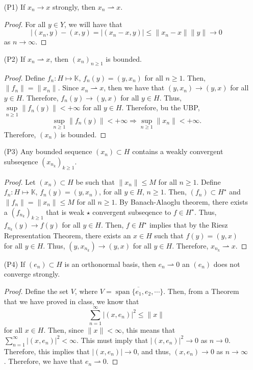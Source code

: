 \documentclass[12pt]{article}
\def\K{\mathbb{K}}
\newcommand{\ov}{\overline}
\newcommand{\sbs}{\subset}
\newcommand{\Hs}{H^{\star}}
\DeclareMathOperator*{\spa}{span}
\newcommand{\weak}{\rightharpoonup}
\begin{document}
\begin{enumerate}[topsep=-15pt]
\item[(P1)] If $x_n \to x$ strongly, then $x_n \weak x$. 
\begin{proof}
For all $y \in Y$, we will have that 
\[ |(x_n, y) - (x, y) = |(x_n - x, y)| \leq \| x_n - x \| \| y \| \to 0\]
as $n \to \infty$. 
\end{proof} 
\item[(P2)] If $x_n \weak x$, then $(x_n)_{n \geq 1}$ is bounded. 
\begin{proof}
Define $f_n: H \mapsto \K$, $f_n(y) = (y, x_n)$ for all $n \geq 1$. Then, $\| f_n \| = \| x_n \|$. Since $x_n \weak x$, then we have that $(y, x_n) \to (y, x)$ for all $y \in H$. Therefore, $f_n(y) \to (y, x)$ for all $y \in H$. Thus, $\sup\limits_{n \geq 1} \| f_n(y)\| < + \infty$ for all $y \in H$. Therefore, bu the UBP, 
\[\sup\limits_{n \geq 1} \| f_n(y)\| < + \infty \Longrightarrow  \sup\limits_{n \geq 1} \| x_n \| < + \infty. \]
Therefore, $(x_n)$ is bounded. 
\end{proof}
\item[(P3)] Any bounded sequence $(x_n) \sbs H$ contains a weakly convergent subseqence $(x_{n_k})_{k \geq 1}$. 
\begin{proof}
Let $(x_n) \sbs H$ be such that $\| x_n \| \leq M$ for all $n \geq 1$. Define $f_n: H \mapsto \K$, $f_n(y) = (y, x_n)$, for all $y \in H$, $n \geq 1$. Then, $(f_n) \sbs \Hs$ and $\| f_n \| = \| x_n \| \leq M$ for all $n \geq 1$. By Banach-Alaoglu theorem, there exists a $(f_{n_k})_{k \geq 1}$ that is weak $\star$ convergent subseqence to $f \in \Hs$. Thus, $f_{n_k}(y) \to f(y)$ for all $y \in H$. Then, $f \in \Hs$ implies that by the Riesz Representation Theorem, there exists an $x \in H$ such that $f(y) = (y, x)$ for all $y \in H$. Thus, $(y, x_{n_k}) \to (y, x)$ for all $y \in H$. Therefore, $x_{n_k} \weak x$. 
\end{proof}
\item[(P4)] If $(e_n) \sbs H$ is an orthonormal basis, then $e_n \weak 0$ an $(e_n)$ does not converge strongly.  
\begin{proof}
Define the set $V$, where $V = \ov{\spa\{ e_1, e_2, \cdots \}}$. Then, from a Theorem that we have proved in class, we know that 
\[ \sum\limits_{n = 1}^{\infty} |(x, e_n)|^2 \leq \| x \|\]
for all $x \in H$. Then, since $\|x \| < \infty$, this means that $\sum\limits_{n = 1}^{\infty} |(x, e_n)|^2 < \infty$. This must imply that $|(x, e_n)|^2 \to 0$ as $n \to 0$. Therefore, this implies that $|(x, e_n)| \to 0$, and thus, $(x, e_n) \to 0$ as $n \to \infty$. Therefore, we have that $e_n \weak 0$. 

\end{proof}
\end{enumerate}
\end{document}
